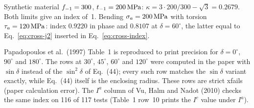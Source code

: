  Synthetic material $f_{-1}=300$, $t_{-1}=200\,\mathrm{MPa}$: $\kappa=3\cdot200/300-\sqrt3=0.2679$.
Both limits give an index of~1. Bending $\sigma_a=200\,\mathrm{MPa}$ with torsion $\tau_a=120\,\mathrm{MPa}$: index
$0.9220$ in phase and $0.8107$ at $\delta=60^\circ$, the latter equal to Eq.~\eqref{eq:cross-j2}
inserted in Eq.~\eqref{eq:cross-index}.

 Papadopoulos et al.\ (1997) Table~1 is reproduced to print precision for
$\delta=0^\circ$, $90^\circ$ and $180^\circ$. The rows at $30^\circ$, $45^\circ$, $60^\circ$ and
$120^\circ$ were computed in the paper with $\sin\delta$ instead of the $\sin^2\delta$ of Eq.~(44);
every such row matches the $\sin\delta$ variant exactly, while Eq.~(44) itself is the enclosing
radius. These rows are strict xfails (paper calculation error). The $I^a$ column of Vu, Halm and
Nadot (2010) \cite{vu2010} checks the same index on 116 of 117 tests (Table~1 row~10 prints the
$I^c$ value under $I^a$).
